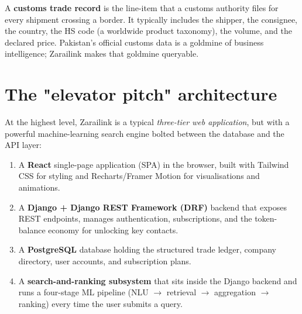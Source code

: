 \documentclass[11pt,a4paper,oneside]{book}
\begin{document}
\begin{noviceBox}
A \textbf{customs trade record} is the line-item that a customs authority
files for every shipment crossing a border. It typically includes the
shipper, the consignee, the country, the HS code (a worldwide product
taxonomy), the volume, and the declared price. Pakistan's official customs
data is a goldmine of business intelligence; Zarailink makes that goldmine
queryable.
\end{noviceBox}

\section{The "elevator pitch" architecture}

At the highest level, Zarailink is a typical \emph{three-tier web
application}, but with a powerful machine-learning search engine bolted
between the database and the API layer:

\begin{enumerate}
  \item A \textbf{React} single-page application (SPA) in the browser, built
        with Tailwind CSS for styling and Recharts/Framer Motion for
        visualisations and animations.
  \item A \textbf{Django + Django REST Framework (DRF)} backend that exposes
        REST endpoints, manages authentication, subscriptions, and the
        token-balance economy for unlocking key contacts.
  \item A \textbf{PostgreSQL} database holding the structured trade
        ledger, company directory, user accounts, and subscription plans.
  \item A \textbf{search-and-ranking subsystem} that sits inside the Django
        backend and runs a four-stage ML pipeline (NLU $\rightarrow$
        retrieval $\rightarrow$ aggregation $\rightarrow$ ranking) every
        time the user submits a query.
\end{enumerate}
\end{document}
